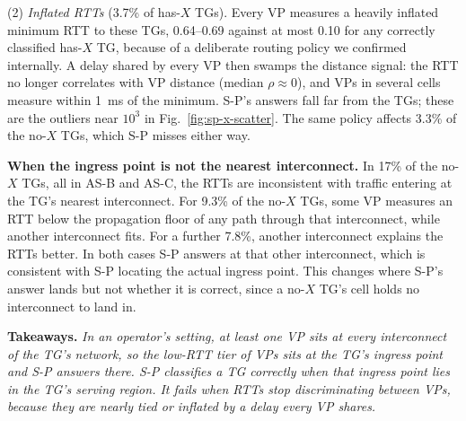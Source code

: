 (2) \emph{Inflated RTTs} (3.7\% of has-$X$ TGs). Every VP measures a heavily inflated minimum RTT to these TGs, 0.64--0.69 against at most 0.10 for any correctly classified has-$X$ TG, because of a deliberate routing policy we confirmed internally. A delay shared by every VP then swamps the distance signal: the RTT no longer correlates with VP distance (median $\rho \approx 0$), and VPs in several cells measure within 1~ms of the minimum. S-P's answers fall far from the TGs; these are the outliers near $10^3$ in Fig.~\ref{fig:sp-x-scatter}. The same policy affects 3.3\% of the no-$X$ TGs, which S-P misses either way. 

\noindent \textbf{When the ingress point is not the nearest interconnect.} In 17\% of the no-$X$ TGs, all in AS-B and AS-C, the RTTs are inconsistent with traffic entering at the TG's nearest interconnect. For 9.3\% of the no-$X$ TGs, some VP measures an RTT below the propagation floor of any path through that interconnect, while another interconnect fits. For a further 7.8\%, another interconnect explains the RTTs better. In both cases S-P answers at that other interconnect, which is consistent with S-P locating the actual ingress point. This changes where S-P's answer lands but not whether it is correct, since a no-$X$ TG's cell holds no interconnect to land in. 

\noindent \textbf{Takeaways.} \textit{In an operator's setting, at least one VP sits at every interconnect of the TG's network, so the low-RTT tier of VPs sits at the TG's ingress point and S-P answers there. S-P classifies a TG correctly when that ingress point lies in the TG's serving region. It fails when RTTs stop discriminating between VPs, because they are nearly tied or inflated by a delay every VP shares.}
